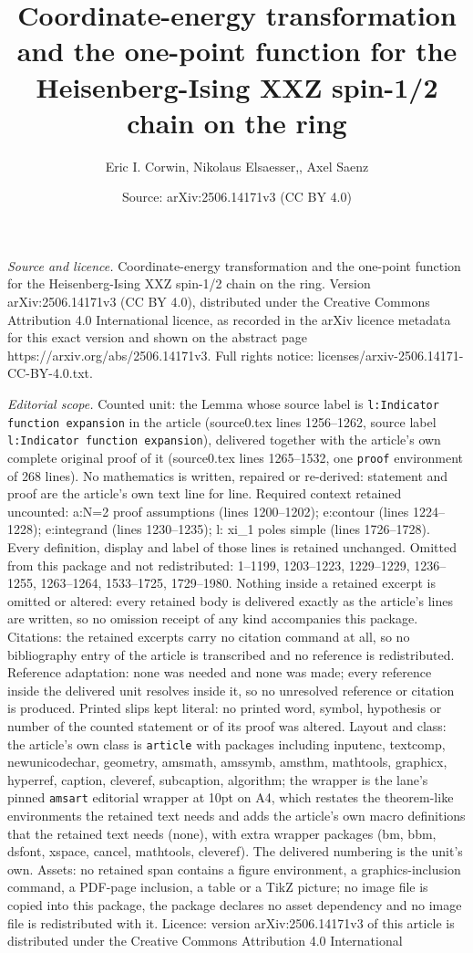 \documentclass[10pt,a4paper]{amsart}
\title[Coordinate-energy transformation and the one-point function ]{Coordinate-energy transformation and the one-point function for the Heisenberg-Ising XXZ spin-1/2 chain on the ring}
\author{Eric I. Corwin, Nikolaus Elsaesser,, Axel Saenz}
\date{Source: arXiv:2506.14171v3 (CC BY 4.0)}
\begin{document}
\maketitle

\noindent\emph{Source and licence.} Coordinate-energy transformation and the one-point function for the Heisenberg-Ising XXZ spin-1/2 chain on the ring. Version arXiv:2506.14171v3 (CC BY 4.0), distributed under the Creative Commons Attribution 4.0 International licence, as recorded in the arXiv licence metadata for this exact version and shown on the abstract page https://arxiv.org/abs/2506.14171v3. Full rights notice: licenses/arxiv-2506.14171-CC-BY-4.0.txt.\par\smallskip

\noindent\textit{Editorial scope.} Counted unit: the Lemma whose source label is \texttt{l:Indicator function expansion} in the article (source0.tex lines 1256--1262, source label \texttt{l:Indicator function expansion}), delivered together with the article's own complete original proof of it (source0.tex lines 1265--1532, one \texttt{proof} environment of 268 lines). No mathematics is written, repaired or re-derived: statement and proof are the article's own text line for line. Required context retained uncounted: a:N=2 proof assumptions (lines 1200--1202); e:contour (lines 1224--1228); e:integrand (lines 1230--1235); l: xi\_1 poles simple (lines 1726--1728). Every definition, display and label of those lines is retained unchanged. Omitted from this package and not redistributed: 1--1199, 1203--1223, 1229--1229, 1236--1255, 1263--1264, 1533--1725, 1729--1980. Nothing inside a retained excerpt is omitted or altered: every retained body is delivered exactly as the article's lines are written, so no omission receipt of any kind accompanies this package. Citations: the retained excerpts carry no citation command at all, so no bibliography entry of the article is transcribed and no reference is redistributed. Reference adaptation: none was needed and none was made; every reference inside the delivered unit resolves inside it, so no unresolved reference or citation is produced. Printed slips kept literal: no printed word, symbol, hypothesis or number of the counted statement or of its proof was altered. Layout and class: the article's own class is \texttt{article} with packages including inputenc, textcomp, newunicodechar, geometry, amsmath, amssymb, amsthm, mathtools, graphicx, hyperref, caption, cleveref, subcaption, algorithm; the wrapper is the lane's pinned \texttt{amsart} editorial wrapper at 10pt on A4, which restates the theorem-like environments the retained text needs and adds the article's own macro definitions that the retained text needs (none), with extra wrapper packages (bm, bbm, dsfont, xspace, cancel, mathtools, cleveref). The delivered numbering is the unit's own. Assets: no retained span contains a figure environment, a graphics-inclusion command, a PDF-page inclusion, a table or a TikZ picture; no image file is copied into this package, the package declares no asset dependency and no image file is redistributed with it. Licence: version arXiv:2506.14171v3 of this article is distributed under the Creative Commons Attribution 4.0 International 
\end{document}
